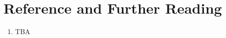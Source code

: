 \documentclass[../main.tex]{subfiles}
\begin{document}
    \section{Reference and Further Reading}
    \begin{enumerate}
        \item TBA
    \end{enumerate}
\end{document}

